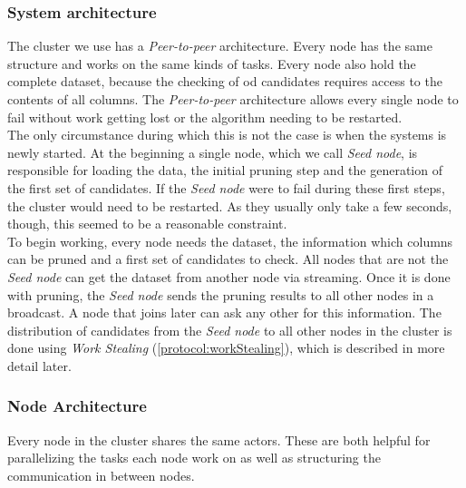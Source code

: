 \subsubsection{System architecture}
The cluster we use has a \emph{Peer-to-peer} architecture.
Every node has the same structure and works on the same kinds of tasks.
Every node also hold the complete dataset, because the checking of \gls{od} candidates requires access to the contents of all columns.
The \emph{Peer-to-peer} architecture allows every single node to fail without work getting lost or the algorithm needing to be restarted. \\
The only circumstance during which this is not the case is when the systems is newly started. 
At the beginning a single node, which we call \emph{Seed node}, is responsible for loading the data, the initial pruning step and the generation of the first set of candidates. 
If the \emph{Seed node} were to fail during these first steps, the cluster would need to be restarted. 
As they usually only take a few seconds, though, this seemed to be a reasonable constraint.\\
To begin working, every node needs the dataset, the information which columns can be pruned and a first set of candidates to check. 
All nodes that are not the \emph{Seed node} can get the dataset from another node via streaming. 
Once it is done with pruning, the \emph{Seed node} sends the pruning results to all other nodes in a broadcast.
A node that joins later can ask any other for this information.
The distribution of candidates from the \emph{Seed node} to all other nodes in the cluster is done using \emph{Work Stealing} (\ref{protocol:workStealing}), which is described in more detail later.

\subsubsection{Node Architecture}
Every node in the cluster shares the same actors.
These are both helpful for parallelizing the tasks each node work on as well as structuring the communication in between nodes.

